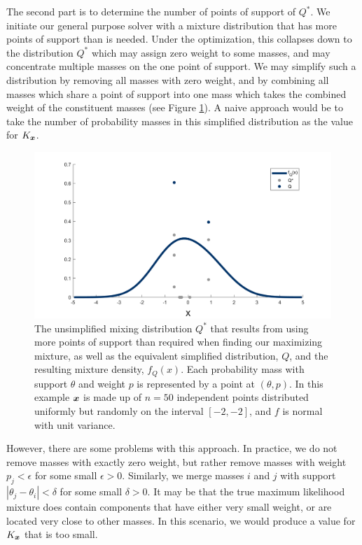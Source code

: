 	The second part is to determine the number of points of support of $Q^*$. We initiate our general purpose solver with a mixture distribution that has more points of support than is needed. Under the optimization, this collapses down to the distribution $Q^*$ which may assign zero weight to some masses, and may concentrate multiple masses on the one point of support. We may simplify such a distribution by removing all masses with zero weight, and by combining all masses which share a point of support into one mass which takes the combined weight of the constituent masses (see Figure \ref{fig:collapsing distribution}). A naive approach would be to take the number of probability masses in this simplified distribution as the value for $K_{\bm{{x}}}$.

	\begin{figure}
		\centering
		\includegraphics[width = \textwidth]{Figures/Mixtures/collapsing_distribution.png}
		\caption[The unsimplified mixing distribution $Q^*$ that results from using more points of support than required when finding our maximizing mixture, as well as the equivalent simplified distribution, $Q$, and the resulting mixture density, $f_Q(x)$.]{The unsimplified mixing distribution $Q^*$ that results from using more points of support than required when finding our maximizing mixture, as well as the equivalent simplified distribution, $Q$, and the resulting mixture density, $f_Q(x)$. Each probability mass with support $\theta$ and weight $p$ is represented by a point at $(\theta, p)$. In this example ${\bm{{x}}}$ is made up of $n = 50$ independent points distributed uniformly but randomly on the interval $[-2,-2]$, and $f$ is normal with unit variance.}
		\label{fig:collapsing distribution}
	\end{figure}

	However, there are some problems with this approach. In practice, we do not remove masses with exactly zero weight, but rather remove masses with weight $p_j < \epsilon$ for some small $\epsilon > 0$. Similarly, we merge masses $i$ and $j$ with support $|\theta_j - \theta_i| < \delta$ for some small $\delta > 0$. It may be that the true maximum likelihood mixture does contain components that have either very small weight, or are located very close to other masses. In this scenario, we would produce a value for $K_{\bm{{x}}}$ that is too small.


